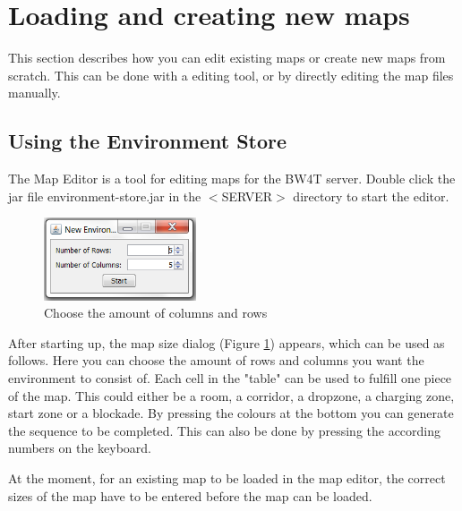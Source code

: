 \newpage

\section{Loading and creating new maps}
This section describes how you can edit existing maps or create new maps from scratch. This can be done with a editing tool, or by directly editing the map files manually.




\subsection{Using the Environment Store}
The Map Editor is a tool for editing maps for the BW4T server. Double click the jar file environment-store.jar  in the $<$SERVER$>$ directory to start the  editor.

\begin{figure}
  \begin{center}
    \includegraphics[width=0.4\textwidth]{EnvironmentStore/SizeDialog.png}
  \end{center}
  \caption{Choose the amount of columns and rows}\label{fig:MapSize}
\end{figure}


After starting up, the map size dialog (Figure \ref{fig:MapSize}) appears, which can be used as follows.
Here you can choose the amount of rows and columns you want the environment to consist of. Each cell in the "table" can be used to fulfill one piece of the map. This could either be a room, a corridor, a dropzone, a charging zone, start zone or a blockade. By pressing the colours at the bottom you can generate the sequence to be completed. This can also be done by pressing the according numbers on the keyboard. 



At the moment, for an existing map to be loaded in the map editor, the correct sizes of the map have to be entered before the map can be loaded.

